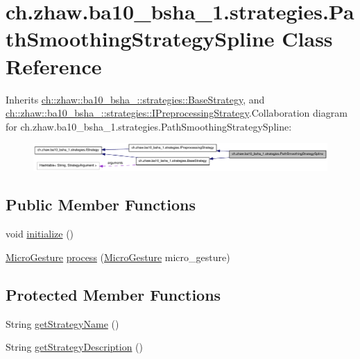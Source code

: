 \hypertarget{classch_1_1zhaw_1_1ba10__bsha__1_1_1strategies_1_1PathSmoothingStrategySpline}{
\section{ch.zhaw.ba10\_\-bsha\_\-1.strategies.PathSmoothingStrategySpline Class Reference}
\label{classch_1_1zhaw_1_1ba10__bsha__1_1_1strategies_1_1PathSmoothingStrategySpline}
}


Inherits \hyperlink{classch_1_1zhaw_1_1ba10__bsha__1_1_1strategies_1_1BaseStrategy}{ch::zhaw::ba10\_\-bsha\_::strategies::BaseStrategy}, and \hyperlink{interfacech_1_1zhaw_1_1ba10__bsha__1_1_1strategies_1_1IPreprocessingStrategy}{ch::zhaw::ba10\_\-bsha\_::strategies::IPreprocessingStrategy}.Collaboration diagram for ch.zhaw.ba10\_\-bsha\_\-1.strategies.PathSmoothingStrategySpline:\nopagebreak
\begin{figure}[H]
\begin{center}
\leavevmode
\includegraphics[width=400pt]{classch_1_1zhaw_1_1ba10__bsha__1_1_1strategies_1_1PathSmoothingStrategySpline__coll__graph}
\end{center}
\end{figure}
\subsection*{Public Member Functions}
\begin{DoxyCompactItemize}
\item 
void \hyperlink{classch_1_1zhaw_1_1ba10__bsha__1_1_1strategies_1_1PathSmoothingStrategySpline_a4f2972f63f03c195fa006367e8e745c6}{initialize} ()
\item 
\hyperlink{classch_1_1zhaw_1_1ba10__bsha__1_1_1service_1_1MicroGesture}{MicroGesture} \hyperlink{classch_1_1zhaw_1_1ba10__bsha__1_1_1strategies_1_1PathSmoothingStrategySpline_ad3e6346b66b88e50ce7c985ff3d99644}{process} (\hyperlink{classch_1_1zhaw_1_1ba10__bsha__1_1_1service_1_1MicroGesture}{MicroGesture} micro\_\-gesture)
\end{DoxyCompactItemize}
\subsection*{Protected Member Functions}
\begin{DoxyCompactItemize}
\item 
String \hyperlink{classch_1_1zhaw_1_1ba10__bsha__1_1_1strategies_1_1PathSmoothingStrategySpline_a1a91b60b6a706bc2365bc2ae9ab727af}{getStrategyName} ()
\item 
String \hyperlink{classch_1_1zhaw_1_1ba10__bsha__1_1_1strategies_1_1PathSmoothingStrategySpline_a5ee7b3c0a4ad6cc7ae5aec7feeda34df}{getStrategyDescription} ()
\end{DoxyCompactItemize}
